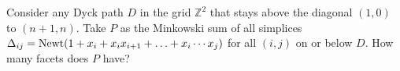 Consider any Dyck path $D$ in the grid $\mathbb{Z}^2$ that stays above the diagonal $(1,0)$ to $(n+1,n)$. Take $P$ as the Minkowski sum of all simplices $\Delta_{ij}={\rm Newt}(1+x_i+x_ix_{i+1}+\ldots+x_i\cdots x_j)$ for all $(i,j)$ on or below $D$. How many facets does $P$ have?
